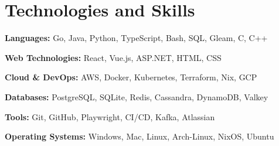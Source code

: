 \documentclass[10pt,a4paper]{article}
\begin{document}
	\section{Technologies and Skills}
	\textbf{Languages:} Go, Java, Python, TypeScript, Bash, SQL, Gleam, C, C++
	
	\textbf{Web Technologies:} React, Vue.js, ASP.NET, HTML, CSS
	
	\textbf{Cloud \& DevOps:} AWS, Docker, Kubernetes, Terraform, Nix, GCP
	
	\textbf{Databases:} PostgreSQL, SQLite, Redis, Cassandra, DynamoDB, Valkey
	
	\textbf{Tools:} Git, GitHub, Playwright, CI/CD, Kafka, Atlassian
	
	\textbf{Operating Systems:} Windows, Mac, Linux, Arch-Linux, NixOS, Ubuntu
	
	
\end{document}
